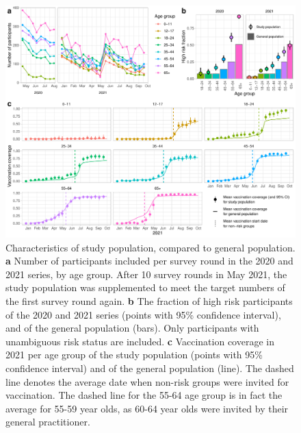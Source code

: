 \documentclass[fleqn,10pt]{wlscirep}
\begin{document}
\begin{figure}[ht]
\centering
\includegraphics[width=\linewidth]{../figures/characteristics_studypopulation.pdf}
\caption{Characteristics of study population, compared to general population. \textbf{a} Number of participants included per survey round in the 2020 and 2021 series, by age group. After 10 survey rounds in May 2021, the study population was supplemented to meet the target numbers of the first survey round again.  \textbf{b} The fraction of high risk participants of the 2020 and 2021 series (points with 95\% confidence interval), and of the general population \cite{Nivel_2021} (bars). Only participants with unambiguous risk status are included. \textbf{c} Vaccination coverage in 2021 per age group of the study population (points with 95\% confidence interval) and of the general population \cite{RIVM_2022} (line). The dashed line denotes the average date when non-risk groups were invited for vaccination. The dashed line for the 55-64 age group is in fact the average for 55-59 year olds, as 60-64 year olds were invited by their general practitioner. }
\label{fig:part}
\end{figure}

\clearpage
\end{document}
